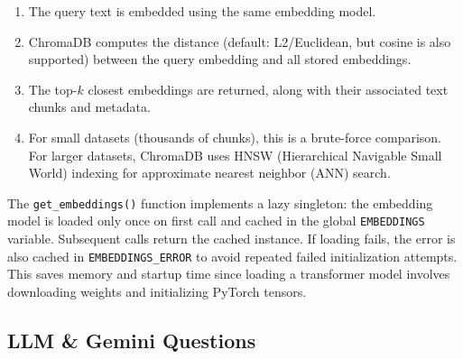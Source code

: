 \documentclass[12pt,a4paper]{article}
\begin{document}
\begin{interviewbox}
\end{interviewbox}
\begin{answerbox}
\begin{enumerate}
  \item The query text is embedded using the same embedding model.
  \item ChromaDB computes the distance (default: L2/Euclidean, but cosine is also supported) between the query embedding and all stored embeddings.
  \item The top-$k$ closest embeddings are returned, along with their associated text chunks and metadata.
  \item For small datasets (thousands of chunks), this is a brute-force comparison. For larger datasets, ChromaDB uses HNSW (Hierarchical Navigable Small World) indexing for approximate nearest neighbor (ANN) search.
\end{enumerate}
\end{answerbox}

\begin{interviewbox}
\end{interviewbox}
\begin{answerbox}
The \texttt{get\_embeddings()} function implements a lazy singleton: the embedding model is loaded only once on first call and cached in the global \texttt{EMBEDDINGS} variable. Subsequent calls return the cached instance. If loading fails, the error is also cached in \texttt{EMBEDDINGS\_ERROR} to avoid repeated failed initialization attempts. This saves memory and startup time since loading a transformer model involves downloading weights and initializing PyTorch tensors.
\end{answerbox}

\subsection{LLM \& Gemini Questions}
\end{document}
